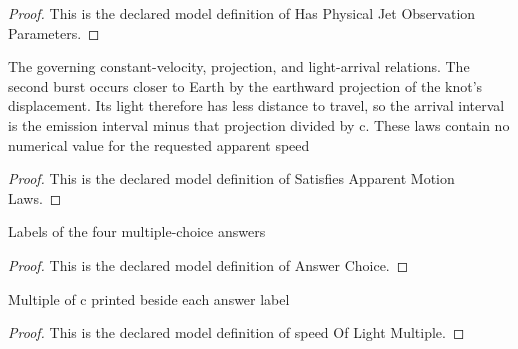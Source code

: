 \begin{proof}
  This is the declared model definition of Has Physical Jet Observation Parameters.
\end{proof}
\begin{definition}
  \label{def:physics:phyx-mini-0594:phyxminiproblems-problemphyxmini0594-satisfiesapparentmotionlaws}
  The governing constant-velocity, projection, and light-arrival relations. The second burst occurs closer to Earth by the earthward projection of the knot's displacement. Its light therefore has less distance to travel, so the arrival interval is the emission interval minus that projection divided by c. These laws contain no numerical value for the requested apparent speed
\end{definition}
\begin{proof}
  This is the declared model definition of Satisfies Apparent Motion Laws.
\end{proof}
\begin{definition}
  \label{def:physics:phyx-mini-0594:phyxminiproblems-problemphyxmini0594-answerchoice}
  Labels of the four multiple-choice answers
\end{definition}
\begin{proof}
  This is the declared model definition of Answer Choice.
\end{proof}
\begin{definition}
  \label{def:physics:phyx-mini-0594:phyxminiproblems-problemphyxmini0594-answerchoice-speedoflightmultiple}
  Multiple of c printed beside each answer label
\end{definition}
\begin{proof}
  This is the declared model definition of speed Of Light Multiple.
\end{proof}
